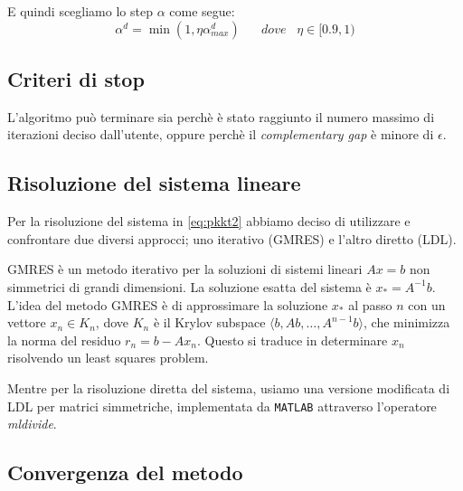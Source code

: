 E quindi scegliamo lo step $\alpha$ come segue:
\begin{equation}\label{eq:alphaFinale}
\alpha^d = \min(1, \eta \alpha^d_{max}) \;\;\;\;\;\; dove\;\;\; \eta \in [0.9, 1)
\end{equation}


\subsection{Criteri di stop}\label{cap:stop}
L'algoritmo può terminare sia perchè è stato raggiunto il numero massimo di iterazioni deciso dall'utente, oppure perchè il \textit{complementary gap} è minore di $\epsilon$.



\subsection{Risoluzione del sistema lineare}\label{cap:RISLS}
Per la risoluzione del sistema in \ref{eq:pkkt2} abbiamo deciso di utilizzare e confrontare due diversi approcci; uno iterativo (GMRES) e l'altro diretto (LDL).

GMRES è un metodo iterativo per la soluzioni di sistemi lineari $Ax=b$ non simmetrici di grandi dimensioni.
La soluzione esatta del sistema è $x_\ast = A^{-1}b$.
L'idea del metodo GMRES è di approssimare la soluzione $x_\ast$ al passo $n$ con un vettore $x_n \in K_n$, dove $K_n$ è il Krylov subspace $\langle b, Ab,\dots,A^{n-1}b\rangle$, che minimizza la norma del residuo $r_n = b - Ax_n$.
Questo si traduce in determinare $x_n$ risolvendo un least squares problem.

Mentre per la risoluzione diretta del sistema, usiamo una versione modificata di LDL per matrici simmetriche, implementata da \texttt{MATLAB} attraverso l'operatore \textit{mldivide}.


\subsection{Convergenza del metodo}\label{cap:Convergenza}

